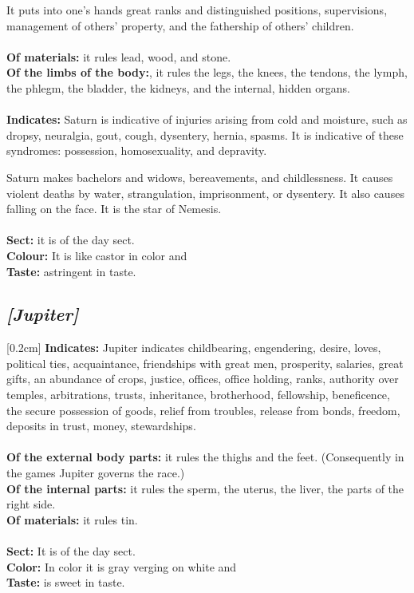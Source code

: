 It puts into one’s hands great ranks and distinguished positions, supervisions, management of others’ property, and the fathership of others’ children. \\
\\
\textbf{Of materials:} it rules lead, wood, and stone. \\
\textbf{Of the limbs of the body:}, it rules the legs, the knees, the tendons, the lymph, the phlegm, the bladder, the kidneys, and the internal, hidden organs. \\
\\
\textbf{Indicates:} Saturn is indicative of injuries arising from cold and moisture, such as dropsy, neuralgia, gout, cough, dysentery, hernia, spasms. It is indicative of these syndromes: possession, homosexuality, and depravity. 

Saturn makes bachelors and widows, bereavements, and childlessness. It causes violent deaths by water, strangulation, imprisonment, or dysentery. It also causes falling on the face. It is the star of Nemesis. \\
\\
\textbf{Sect:} it is of the day sect.\\
\textbf{Colour:} It is like castor in color and \\
\textbf{Taste:} astringent in taste.

\secbr
\subsection{\textit{[Jupiter]}}
[0.2cm]
\noindent
\textbf{Indicates:}  Jupiter indicates childbearing, engendering, desire, loves, political ties, acquaintance, friendships with great men, prosperity, salaries, great gifts, an abundance of crops, justice, offices, office holding, ranks, authority over temples, arbitrations, trusts, inheritance, brotherhood, fellowship, beneficence, the secure possession of goods, relief from troubles, release from bonds, freedom, deposits in trust, money, stewardships. \\
\\
\textbf{Of the external body parts:} it rules the thighs and the feet. (Consequently in the games Jupiter governs the race.)\\
\textbf{Of the internal parts:}  it rules the sperm, the uterus, the liver, the parts of the right side. \\
\textbf{Of materials:} it rules tin. \\
\\
\textbf{Sect:} It is of the day sect. \\
\textbf{Color:} In color it is gray verging on white and \\
\textbf{Taste:} is sweet in taste.

